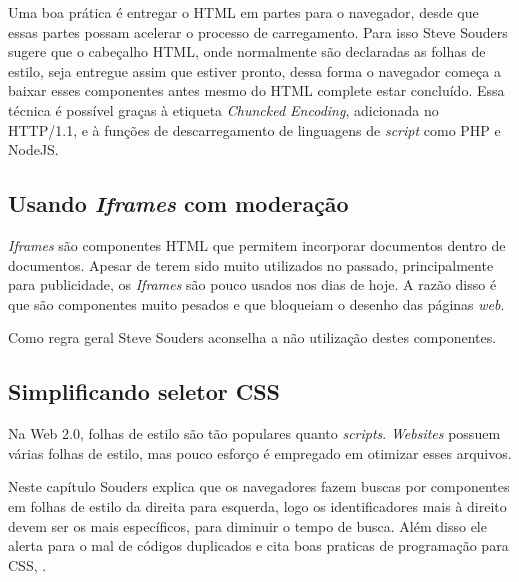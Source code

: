 Uma boa prática é entregar o HTML em partes para o navegador, desde que essas partes possam acelerar o processo de carregamento. Para isso Steve Souders sugere que o cabeçalho HTML, onde normalmente são declaradas as folhas de estilo, seja entregue assim que estiver pronto, dessa forma o navegador começa a baixar esses componentes antes mesmo do HTML complete estar concluído. Essa técnica é possível graças à etiqueta \textit{Chuncked Encoding}, adicionada no HTTP/1.1, e à funções de descarregamento de linguagens de \textit{script} como PHP e NodeJS.

\subsection{Usando \textit{Iframes} com moderação}
\label{subsec:evenfaster_cap13}
\textit{Iframes} são componentes HTML que permitem incorporar documentos dentro de documentos. Apesar de terem sido muito utilizados no passado, principalmente para publicidade, os \textit{Iframes} são pouco usados nos dias de hoje. A razão disso é que são componentes muito pesados e que bloqueiam o desenho das páginas \textit{web}.

Como regra geral Steve Souders aconselha a não utilização destes componentes.

\subsection{Simplificando seletor CSS}
\label{subsec:evenfaster_cap14}
Na Web 2.0, folhas de estilo são tão populares quanto \textit{scripts}. \textit{Websites} possuem várias folhas de estilo, mas pouco esforço é empregado em otimizar esses arquivos.

Neste capítulo Souders explica que os navegadores fazem buscas por componentes em folhas de estilo da direita para esquerda, logo os identificadores mais à direito devem ser os mais específicos, para diminuir o tempo de busca. Além disso ele alerta para o mal de códigos duplicados e cita boas praticas de programação para CSS,  \cite[p.~195]{EvenFaster}.
